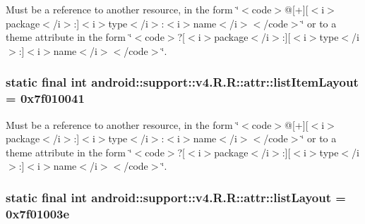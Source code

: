 Must be a reference to another resource, in the form \char`\"{}$<$code$>$@\mbox{[}+\mbox{]}\mbox{[}$<$i$>$package$<$/i$>$:\mbox{]}$<$i$>$type$<$/i$>$:$<$i$>$name$<$/i$>$$<$/code$>$\char`\"{} or to a theme attribute in the form \char`\"{}$<$code$>$?\mbox{[}$<$i$>$package$<$/i$>$:\mbox{]}\mbox{[}$<$i$>$type$<$/i$>$:\mbox{]}$<$i$>$name$<$/i$>$$<$/code$>$\char`\"{}. \hypertarget{classandroid_1_1support_1_1v4_1_1_r_1_1attr_c733be5fa576e724d924100ec23a326a}{
\subsubsection[{listItemLayout}]{\setlength{\rightskip}{0pt plus 5cm}static final int android::support::v4.R.R::attr::listItemLayout = 0x7f010041}}
\label{classandroid_1_1support_1_1v4_1_1_r_1_1attr_c733be5fa576e724d924100ec23a326a}


Must be a reference to another resource, in the form \char`\"{}$<$code$>$@\mbox{[}+\mbox{]}\mbox{[}$<$i$>$package$<$/i$>$:\mbox{]}$<$i$>$type$<$/i$>$:$<$i$>$name$<$/i$>$$<$/code$>$\char`\"{} or to a theme attribute in the form \char`\"{}$<$code$>$?\mbox{[}$<$i$>$package$<$/i$>$:\mbox{]}\mbox{[}$<$i$>$type$<$/i$>$:\mbox{]}$<$i$>$name$<$/i$>$$<$/code$>$\char`\"{}. \hypertarget{classandroid_1_1support_1_1v4_1_1_r_1_1attr_986764bbce8329b87353bcfe79effe4e}{
\subsubsection[{listLayout}]{\setlength{\rightskip}{0pt plus 5cm}static final int android::support::v4.R.R::attr::listLayout = 0x7f01003e}}
\label{classandroid_1_1support_1_1v4_1_1_r_1_1attr_986764bbce8329b87353bcfe79effe4e}


